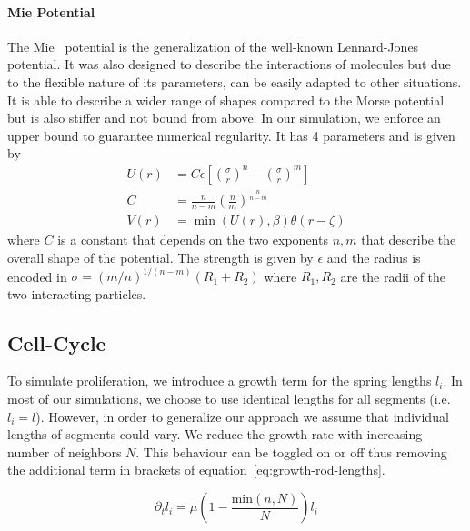 \documentclass{article}
\begin{document}
\paragraph{Mie Potential}
The Mie~\cite{Mie1903} potential is the generalization of the well-known
Lennard-Jones~\cite{Jones1924} potential.
It was also designed to describe the interactions of molecules but due to the flexible nature of its
parameters, can be easily adapted to other situations.
It is able to describe a wider range of shapes compared to the Morse potential but is also stiffer
and not bound from above.
In our simulation, we enforce an upper bound to guarantee numerical regularity.
It has 4 parameters and is given by
\begin{align}
    U(r) &= C\epsilon\left[ \left(\frac{\sigma}{r}\right)^n -
        \left(\frac{\sigma}{r}\right)^m\right]\\
    C &= \frac{n}{n-m}\left(\frac{n}{m}\right)^{\frac{n}{n-m}}\\
    V(r) &= \min(U(r), \beta)\theta(r-\zeta)
\end{align}
where $C$ is a constant that depends on the two exponents $n,m$ that describe the overall shape of
the potential.
The strength is given by $\epsilon$ and the radius is encoded in $\sigma =
(m/n)^{1/(n-m)}(R_1+R_2)$ where $R_1,R_2$ are the radii of the two interacting particles.

\subsection{Cell-Cycle}
\label{subsection:mechanical-model-cycle}

To simulate proliferation, we introduce a growth term for the spring lengths $l_i$.
In most of our simulations, we choose to use identical lengths for all segments (i.e. $l_i=l$).
However, in order to generalize our approach we assume that individual lengths of segments could
vary.
We reduce the growth rate with increasing number of neighbors $N$.
This behaviour can be toggled on or off thus removing the additional term in brackets of
equation~\ref{eq:growth-rod-lengths}.

\begin{equation}
    \partial_t l_i = \mu\left(1-\frac{\text{min}(n,N)}{N}\right)l_i
    \label{eq:growth-rod-lengths}
\end{equation}
\end{document}

